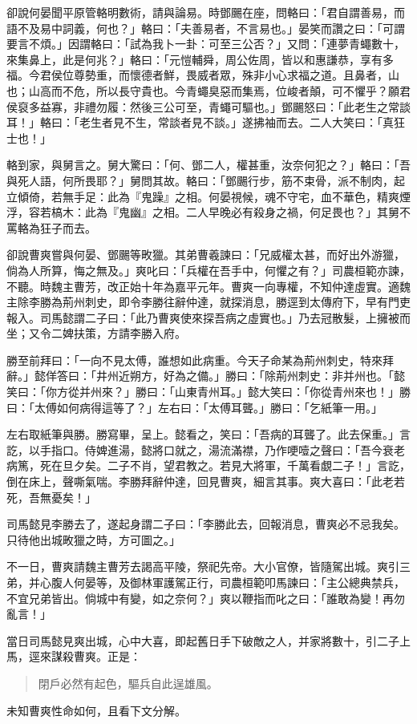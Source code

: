 卻說何晏聞平原管輅明數術，請與論易。時鄧颺在座，問輅曰：「君自謂善易，而語不及易中詞義，何也？」輅曰：「夫善易者，不言易也。」晏笑而讚之曰：「可謂要言不煩。」因謂輅曰：「試為我卜一卦：可至三公否？」又問：「連夢青蠅數十，來集鼻上，此是何兆？」輅曰：「元愷輔舜，周公佐周，皆以和惠謙恭，享有多福。今君侯位尊勢重，而懷德者鮮，畏威者眾，殊非小心求福之道。且鼻者，山也；山高而不危，所以長守貴也。今青蠅臭惡而集焉，位峻者顛，可不懼乎？願君侯裒多益寡，非禮勿履：然後三公可至，青蠅可驅也。」鄧颺怒曰：「此老生之常談耳！」輅曰：「老生者見不生，常談者見不談。」遂拂袖而去。二人大笑曰：「真狂士也！」

輅到家，與舅言之。舅大驚曰：「何、鄧二人，權甚重，汝奈何犯之？」輅曰：「吾與死人語，何所畏耶？」舅問其故。輅曰：「鄧颺行步，筋不束骨，派不制肉，起立傾倚，若無手足：此為『鬼躁』之相。何晏視候，魂不守宅，血不華色，精爽煙浮，容若槁木：此為『鬼幽』之相。二人早晚必有殺身之禍，何足畏也？」其舅不罵輅為狂子而去。

卻說曹爽嘗與何晏、鄧颺等畋獵。其弟曹羲諫曰：「兄威權太甚，而好出外游獵，倘為人所算，悔之無及。」爽叱曰：「兵權在吾手中，何懼之有？」司農桓範亦諫，不聽。時魏主曹芳，改正始十年為嘉平元年。曹爽一向專權，不知仲達虛實。適魏主除李勝為荊州刺史，即令李勝往辭仲達，就探消息，勝逕到太傳府下，早有門吏報入。司馬懿謂二子曰：「此乃曹爽使來探吾病之虛實也。」乃去冠散髮，上擁被而坐；又令二婢扶策，方請李勝入府。

勝至前拜曰：「一向不見太傅，誰想如此病重。今天子命某為荊州刺史，特來拜辭。」懿佯答曰：「井州近朔方，好為之備。」勝曰：「除荊州刺史：非并州也。「懿笑曰：「你方從并州來？」勝曰：「山東青州耳。」懿大笑曰：「你從青州來也！」勝曰：「太傅如何病得這等了？」左右曰：「太傅耳聾。」勝曰：「乞紙筆一用。」

左右取紙筆與勝。勝寫畢，呈上。懿看之，笑曰：「吾病的耳聾了。此去保重。」言訖，以手指口。侍婢進湯，懿將口就之，湯流滿襟，乃作哽噎之聲曰：「吾今衰老病篤，死在旦夕矣。二子不肖，望君教之。若見大將軍，千萬看覷二子！」言訖，倒在床上，聲嘶氣喘。李勝拜辭仲達，回見曹爽，細言其事。爽大喜曰：「此老若死，吾無憂矣！」

司馬懿見李勝去了，遂起身謂二子曰：「李勝此去，回報消息，曹爽必不忌我矣。只待他出城畋獵之時，方可圖之。」

不一日，曹爽請魏主曹芳去謁高平陵，祭祀先帝。大小官僚，皆隨駕出城。爽引三弟，并心腹人何晏等，及御林軍護駕正行，司農桓範叩馬諫曰：「主公總典禁兵，不宜兄弟皆出。倘城中有變，如之奈何？」爽以鞭指而叱之曰：「誰敢為變！再勿亂言！」

當日司馬懿見爽出城，心中大喜，即起舊日手下破敵之人，并家將數十，引二子上馬，逕來謀殺曹爽。正是：

\begin{quote}
閉戶必然有起色，驅兵自此逞雄風。
\end{quote}

未知曹爽性命如何，且看下文分解。
